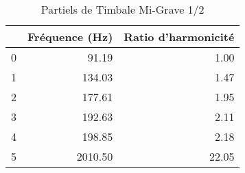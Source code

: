\begin{table}
\centering
\caption{Partiels de Timbale Mi-Grave 1/2}
\label{table:partiels-timbale-migrave-2.wav}
\begin{tabular}{lrr}
\toprule
{} &  Fréquence (Hz) &  Ratio d'harmonicité \\
\midrule
0 &           91.19 &                 1.00 \\
1 &          134.03 &                 1.47 \\
2 &          177.61 &                 1.95 \\
3 &          192.63 &                 2.11 \\
4 &          198.85 &                 2.18 \\
5 &         2010.50 &                22.05 \\
\bottomrule
\end{tabular}
\end{table}
